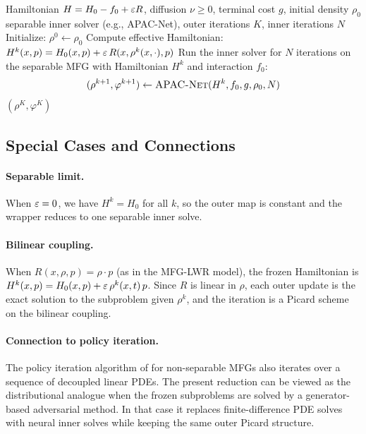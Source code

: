 \begin{algorithm}[H]
\caption{Fixed-point reduction with a GAN-compatible inner solver}
\label{alg:main}
\begin{algorithmic}[1]
\Require Hamiltonian $H = H_0 - f_0 + \varepsilon R$, diffusion $\nu \geq 0$,
         terminal cost $g$, initial density $\rho_0$
\Require separable inner solver (e.g., APAC-Net), outer iterations $K$,
         inner iterations $N$
\State Initialize: $\rho^0 \leftarrow \rho_0$
  \State Compute effective Hamiltonian:
    $H^k(x,p) = H_0(x,p) + \varepsilon\, R(x, \rho^k(x,\cdot), p)$
  \State Run the inner solver for $N$ iterations on the separable MFG
    with Hamiltonian $H^k$ and interaction $f_0$:
    \[
      (\rho^{k+1}, \varphi^{k+1}) \leftarrow \textsc{APAC-Net}(H^k, f_0, g, \rho_0, N)
    \]
\EndFor
\State \Return $(\rho^K, \varphi^K)$
\end{algorithmic}
\end{algorithm}

\subsection{Special Cases and Connections}

\paragraph{Separable limit.}
When $\varepsilon = 0$, we have $H^k = H_0$ for all $k$, so the outer map is
constant and the wrapper reduces to one separable inner solve.

\paragraph{Bilinear coupling.}
When $R(x,\rho,p) = \rho\cdot p$ (as in the MFG-LWR model), the frozen
Hamiltonian is $H^k(x,p) = H_0(x,p) + \varepsilon\,\rho^k(x,t)\,p$.
Since $R$ is linear in $\rho$, each outer update is the exact solution to
the subproblem given $\rho^k$, and the iteration is a Picard scheme
on the bilinear coupling.

\paragraph{Connection to policy iteration.}
The policy iteration algorithm of \citet{lavigne2023policy} for non-separable
MFGs also iterates over a sequence of decoupled linear PDEs.
The present reduction can be viewed as the distributional analogue when
the frozen subproblems are solved by a generator-based adversarial method.
In that case it replaces finite-difference PDE solves with neural inner
solves while keeping the same outer Picard structure.

